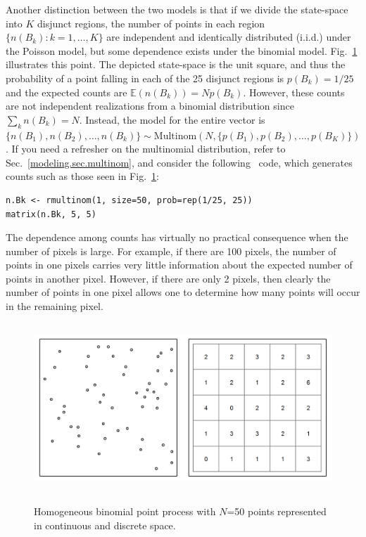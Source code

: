 Another distinction between the two models is that if we divide the
state-space into $K$ disjunct regions, the number of points in each
region $\{ n(B_k): k=1,\dots,K \}$ are
independent and identically distributed (i.i.d.) under the Poisson model,
but some dependence exists under the binomial model.
Fig.~\ref{state-space.fig.homo} illustrates this point.
The depicted state-space is the unit square, and thus the probability of a
point falling in each of the 25 disjunct regions is $p(B_k) = 1/25$ and
the expected counts are $\mathbb{E}(n(B_k)) = Np(B_k)$.
However, these counts are not
independent realizations from a binomial distribution since $\sum_k %
n(B_k) = N$. Instead, the model for the entire vector is
$\{n(B_1), n(B_2), \dots, n(B_k)\} \sim \mbox{Multinom}(N, \{p(B_1), p(B_2), \dots,
p(B_K) \})$ \citep{illian_etal:2008}. If you need a refresher on the
multinomial distribution, refer to Sec.~\ref{modeling.sec.multinom}, and
consider the following \R~code, which generates counts such as those
seen in Fig.~\ref{state-space.fig.homo}:
\begin{verbatim}
n.Bk <- rmultinom(1, size=50, prob=rep(1/25, 25))
matrix(n.Bk, 5, 5)
\end{verbatim}

The dependence among counts has virtually
no practical consequence when the number of pixels is large. For
example, if there are 100 pixels, the number of points in one pixels
carries very little information about the expected number of points in another
pixel. However, if there are only 2 pixels, then clearly the number of
points in one pixel allows one to determine how many points will occur in the
remaining pixel.


\begin{figure}[ht!]
\centering
\includegraphics[width=5in,height=2.5in]{Ch11/figs/homoPlots}
\label{state-space.fig.homo}
\caption{Homogeneous binomial point process with $N$=50 points
  represented in continuous and discrete space.}
\end{figure}



